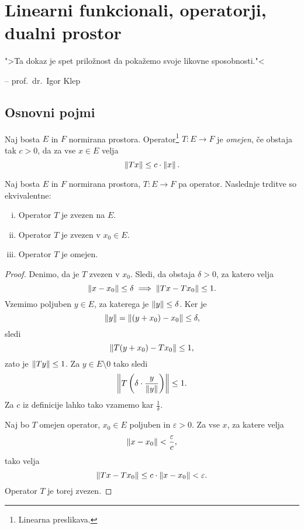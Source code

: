 \section{Linearni funkcionali, operatorji, dualni prostor}

\epigraph{">Ta dokaz je spet priložnost da pokažemo svoje likovne
sposobnosti."<}{-- prof.~dr.~Igor Klep}

\subsection{Osnovni pojmi}

\begin{definicija}
Naj bosta $E$ in $F$ normirana prostora.
Operator\footnote{Linearna preslikava.} $T \colon E \to F$ je
\emph{omejen}, če obstaja tak $c > 0$, da za
vse $x \in E$ velja
\[
\left\lVert Tx\right\rVert \leq c \cdot \left\lVert x\right\rVert.
\]
\end{definicija}

\begin{izrek}
Naj bosta $E$ in $F$ normirana prostora, $T \colon E \to F$ pa
operator. Naslednje trditve so ekvivalentne:

\begin{enumerate}[i)]
\item Operator $T$ je zvezen na $E$.
\item Operator $T$ je zvezen v $x_0 \in E$.
\item Operator $T$ je omejen.
\end{enumerate}
\end{izrek}

\begin{proof}
Denimo, da je $T$ zvezen v $x_0$. Sledi, da obstaja $\delta > 0$,
za katero velja
\[
\left\lVert x - x_0\right\rVert \leq \delta \implies \left\lVert Tx - Tx_0\right\rVert \leq 1.
\]
Vzemimo poljuben $y \in E$, za katerega je $\left\lVert y\right\rVert \leq \delta$.
Ker je
\[
\left\lVert y\right\rVert = \left\lVert (y+x_0) - x_0\right\rVert \leq \delta,
\]
sledi
\[
\left\lVert T(y + x_0) - Tx_0\right\rVert \leq 1,
\]
zato je $\left\lVert Ty\right\rVert \leq 1$. Za $y \in E \setminus 0$ tako sledi
\[
\left\lVert T\left(\delta \cdot \frac{y}{\left\lVert y\right\rVert}\right)\right\rVert \leq 1.
\]
Za $c$ iz definicije lahko tako vzamemo kar $\frac{1}{\delta}$.

Naj bo $T$ omejen operator, $x_0 \in E$ poljuben in
$\varepsilon > 0$. Za vse $x$, za katere velja
\[
\left\lVert x - x_0\right\rVert < \frac{\varepsilon}{c},
\]
tako velja
\[
\left\lVert Tx - Tx_0\right\rVert \leq c \cdot \left\lVert x - x_0\right\rVert < \varepsilon.
\]
Operator $T$ je torej zvezen.
\end{proof}

